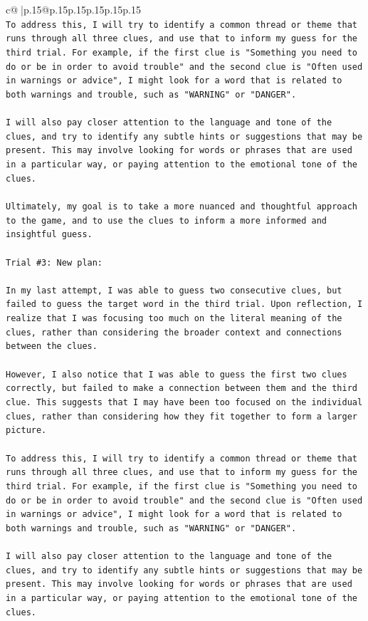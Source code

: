 \documentclass{article}
\begin{document}
{\begin{supertabular}{c@{$\;$}|p{.15\linewidth}@{}p{.15\linewidth}p{.15\linewidth}p{.15\linewidth}p{.15\linewidth}p{.15\linewidth}}
{{{\\ 
\texttt{To address this, I will try to identify a common thread or theme that runs through all three clues, and use that to inform my guess for the third trial. For example, if the first clue is "Something you need to do or be in order to avoid trouble" and the second clue is "Often used in warnings or advice", I might look for a word that is related to both warnings and trouble, such as "WARNING" or "DANGER". } \\
\\ 
\texttt{I will also pay closer attention to the language and tone of the clues, and try to identify any subtle hints or suggestions that may be present. This may involve looking for words or phrases that are used in a particular way, or paying attention to the emotional tone of the clues. } \\
\\ 
\texttt{Ultimately, my goal is to take a more nuanced and thoughtful approach to the game, and to use the clues to inform a more informed and insightful guess.} \\
\\ 
\texttt{Trial \#3: New plan: } \\
\\ 
\texttt{In my last attempt, I was able to guess two consecutive clues, but failed to guess the target word in the third trial. Upon reflection, I realize that I was focusing too much on the literal meaning of the clues, rather than considering the broader context and connections between the clues. } \\
\\ 
\texttt{However, I also notice that I was able to guess the first two clues correctly, but failed to make a connection between them and the third clue. This suggests that I may have been too focused on the individual clues, rather than considering how they fit together to form a larger picture. } \\
\\ 
\texttt{To address this, I will try to identify a common thread or theme that runs through all three clues, and use that to inform my guess for the third trial. For example, if the first clue is "Something you need to do or be in order to avoid trouble" and the second clue is "Often used in warnings or advice", I might look for a word that is related to both warnings and trouble, such as "WARNING" or "DANGER". } \\
\\ 
\texttt{I will also pay closer attention to the language and tone of the clues, and try to identify any subtle hints or suggestions that may be present. This may involve looking for words or phrases that are used in a particular way, or paying attention to the emotional tone of the clues. } \\
}}}
\end{supertabular}}
\end{document}
